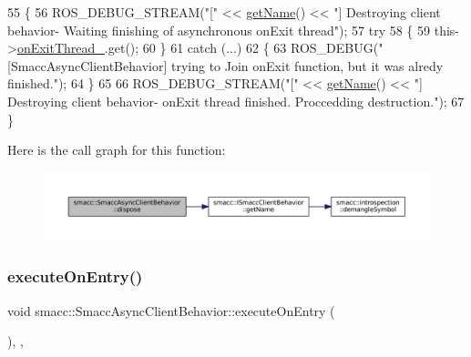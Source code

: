 \begin{DoxyCode}
55     \{
56         ROS\_DEBUG\_STREAM(\textcolor{stringliteral}{"["} << \hyperlink{classsmacc_1_1ISmaccClientBehavior_a18e4bec9460b010f2894c0f7e7064a34}{getName}() << \textcolor{stringliteral}{"] Destroying client behavior- Waiting finishing of
       asynchronous onExit thread"});
57         \textcolor{keywordflow}{try}
58         \{
59             this->\hyperlink{classsmacc_1_1SmaccAsyncClientBehavior_af76d1c36b4a10425f2da043545b73299}{onExitThread\_}.get();
60         \}
61         \textcolor{keywordflow}{catch} (...)
62         \{
63             ROS\_DEBUG(\textcolor{stringliteral}{"[SmaccAsyncClientBehavior] trying to Join onExit function, but it was alredy
       finished."});
64         \}
65 
66         ROS\_DEBUG\_STREAM(\textcolor{stringliteral}{"["} << \hyperlink{classsmacc_1_1ISmaccClientBehavior_a18e4bec9460b010f2894c0f7e7064a34}{getName}() << \textcolor{stringliteral}{"] Destroying client behavior-  onExit thread finished.
       Proccedding destruction."});
67     \}
\end{DoxyCode}
Here is the call graph for this function\+:
\nopagebreak
\begin{figure}[H]
\begin{center}
\leavevmode
\includegraphics[width=350pt]{classsmacc_1_1SmaccAsyncClientBehavior_af475cee853947a8d3f513c7fb9789e7a_cgraph}
\end{center}
\end{figure}
\mbox{\label{classsmacc_1_1SmaccAsyncClientBehavior_ab8ca63d40d61554263466fe4c0b5cbd1}} 
\subsubsection{\texorpdfstring{execute\+On\+Entry()}{executeOnEntry()}}
{\footnotesize\ttfamily void smacc\+::\+Smacc\+Async\+Client\+Behavior\+::execute\+On\+Entry (\begin{DoxyParamCaption}{ }\end{DoxyParamCaption})\hspace{0.3cm}{\ttfamily [override]}, {\ttfamily [protected]}, {\ttfamily [virtual]}}



